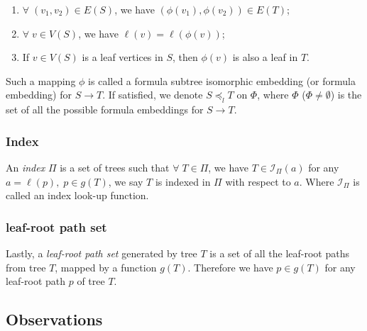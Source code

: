 \begin{enumerate}
\item 
$\forall\; (v_1,v_2) \in E(S)$, we have $(\phi(v_1),\phi(v_2)) \in E(T)$;
\item
$\forall\; v \in V(S)$, we have $\ell(v) = \ell(\phi(v))$;
\item
If $v \in V(S)$ is a leaf vertices in $S$, then $\phi(v)$ is also a leaf in $T$.
\end{enumerate}
Such a mapping $\phi$ is called a formula subtree isomorphic embedding (or formula embedding) for $S \rightarrow T$. 
If satisfied, we denote $S \preceq_l T$ on $\Phi$, where $\Phi$ ($\Phi \neq \emptyset$) is the set of all the possible formula embeddings for $S \rightarrow T$.

\subsubsection{Index}
An \textit{index} $\Pi$ is a set of trees such that $\forall\; T \in \Pi$, we have $T \in \mathcal{I}_{\Pi}(a)$ for any $a = \ell(p), \; p \in g(T)$, we say $T$ is indexed in $\Pi$ with respect to $a$.
Where $\mathcal{I}_{\Pi}$ is called an index look-up function. 

\subsubsection{leaf-root path set}
Lastly, a \textit{leaf-root path set} generated by tree $T$ is a set of all the leaf-root paths from tree $T$, mapped by a function $g(T)$. Therefore we have $p \in g(T)$ for any leaf-root path $p$ of tree $T$.


\subsection{Observations}
\label{observationlabel}

